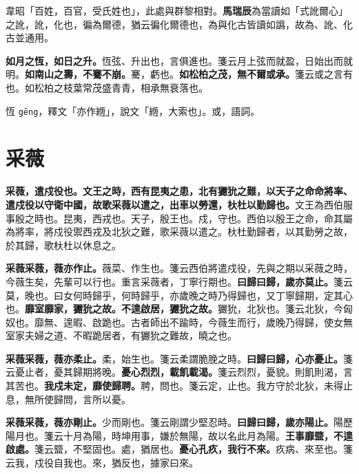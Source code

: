 \begin{quoting}韋昭「百姓，百官，受氏姓也」，此處與群黎相對。\textbf{馬瑞辰}為當讀如「式訛爾心」之訛，訛，化也，徧為爾德，猶云徧化爾德也，為與化古皆讀如譌，故為、訛、化古並通用。\end{quoting}

\textbf{如月之恆，如日之升。}{\footnotesize 恆弦、升出也，言俱進也。箋云月上弦而就盈，日始出而就明。}\textbf{如南山之壽，不騫不崩。}{\footnotesize 騫，虧也。}\textbf{如松柏之茂，無不爾或承。}{\footnotesize 箋云或之言有也。如松柏之枝葉常茂盛青青，相承無衰落也。}

\begin{quoting}恆 \texttt{gēng}，釋文「亦作緪」，說文「緪，大索也」。或，語詞。\end{quoting}

\section{采薇}


\textbf{采薇，遣戍役也。文王之時，西有昆夷之患，北有玁狁之難，以天子之命命將率、遣戍役以守衛中國，故歌采薇以遣之，出車以勞還，杕杜以勤歸也。}{\footnotesize 文王為西伯服事殷之時也。昆夷，西戎也。天子，殷王也。戍，守也。西伯以殷王之命，命其屬為將率，將戍役禦西戎及北狄之難，歌采薇以遣之。杕杜勤歸者，以其勤勞之故，於其歸，歌杕杜以休息之。}

\textbf{采薇采薇，薇亦作止。}{\footnotesize 薇菜、作生也。箋云西伯將遣戍役，先與之期以采薇之時，今薇生矣，先輩可以行也。重言采薇者，丁寧行期也。}\textbf{曰歸曰歸，歲亦莫止。}{\footnotesize 箋云莫，晚也。曰女何時歸乎，何時歸乎，亦歲晚之時乃得歸也，又丁寧歸期，定其心也。}\textbf{靡室靡家，玁狁之故。不遑啟居，玁狁之故。}{\footnotesize 玁狁，北狄也。箋云北狄，今匈奴也。靡無、遑暇、啟跪也。古者師出不踰時，今薇生而行，歲晚乃得歸，使女無室家夫婦之道、不暇跪居者，有玁狁之難故，曉之也。}

\textbf{采薇采薇，薇亦柔止。}{\footnotesize 柔，始生也。箋云柔謂脆脕之時。}\textbf{曰歸曰歸，心亦憂止。}{\footnotesize 箋云憂止者，憂其歸期將晚。}\textbf{憂心烈烈，載飢載渴。}{\footnotesize 箋云烈烈，憂貌。則飢則渴，言其苦也。}\textbf{我戍未定，靡使歸聘。}{\footnotesize 聘，問也。箋云定，止也。我方守於北狄，未得止息，無所使歸問，言所以憂。}

\textbf{采薇采薇，薇亦剛止。}{\footnotesize 少而剛也。箋云剛謂少堅忍時。}\textbf{曰歸曰歸，歲亦陽止。}{\footnotesize 陽歷陽月也。箋云十月為陽，時坤用事，嫌於無陽，故以名此月為陽。}\textbf{王事靡盬，不遑啟處。}{\footnotesize 箋云盬，不堅固也。處，猶居也。}\textbf{憂心孔疚，我行不來。}{\footnotesize 疚病、來至也。箋云我，戍役自我也。來，猶反也，據家曰來。}

